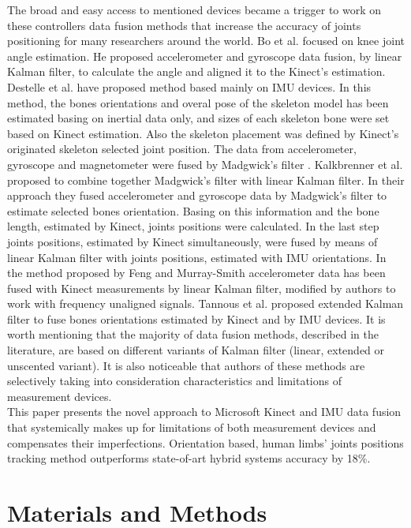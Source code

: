 \documentclass[sensors,article,submit,moreauthors,pdftex,10pt,a4paper]{mdpi}
\begin{document}
The broad and easy access to mentioned devices became a trigger to work on these controllers data fusion methods that increase the accuracy of joints positioning for many researchers around the world. Bo et al. \cite{Bo2011a} focused on knee joint angle estimation. He proposed accelerometer and gyroscope data fusion, by linear Kalman filter, to calculate the angle and aligned it to the Kinect’s estimation. Destelle et al. \cite{Destelle2014} have proposed method based mainly on IMU devices. In this method, the bones orientations and overal pose of the skeleton model has been estimated basing on inertial data only, and sizes of each skeleton bone were set based on Kinect estimation. Also the skeleton placement was defined by Kinect's originated skeleton selected joint position. The data from accelerometer, gyroscope and magnetometer were fused by Madgwick’s filter \cite{Madgwick2011}. Kalkbrenner et al. \cite{Kalkbrenner2014} proposed to combine together Madgwick’s filter with linear Kalman filter. In their approach they fused accelerometer and gyroscope data by Madgwick’s filter to estimate selected bones orientation. Basing on this information and the bone length, estimated by Kinect, joints positions were calculated. In the last step joints positions, estimated by Kinect simultaneously, were fused by means of linear Kalman filter with joints positions, estimated with IMU orientations. In the method proposed by Feng and Murray-Smith \cite{Murray-Smith2014} accelerometer data has been fused with Kinect measurements by linear Kalman filter, modified by authors to work with frequency unaligned signals. Tannous et al. \cite{Tannous2016} proposed extended Kalman filter to fuse bones orientations estimated by Kinect and by IMU devices. It is worth mentioning that the majority of data fusion methods, described in the literature, are based on different variants of Kalman filter (linear, extended or unscented variant). It is also noticeable that authors of these methods are selectively taking into consideration characteristics and limitations of measurement devices. \\
This paper presents the novel approach to Microsoft Kinect and IMU data fusion that systemically makes up for limitations of both measurement devices and compensates their imperfections. Orientation based, human limbs’ joints positions tracking method outperforms state-of-art hybrid systems accuracy by 18\%.

\section{Materials and Methods}
\end{document}
